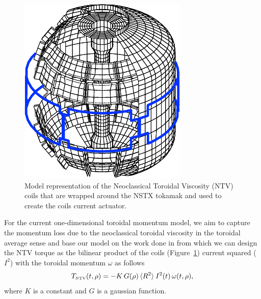 \documentclass[12pt]{iopart}
\begin{document}
\begin{figure}
	\centering
   \includegraphics[width=0.6\linewidth]{imene_figs/pic_NTV}
\caption{Model representation of the Neoclassical Toroidal Viscosity (NTV) coils that are wrapped around the NSTX tokamak and used to create the coils current actuator. }
  \label{pic_NTV}
\end{figure}
For the current one-dimensional toroidal momentum model, we aim to capture the momentum loss due to the neoclassical toroidal viscosity in the toroidal average sense and base our model on the work done in \cite{Zhu06} from which we can design the NTV torque as the bilinear product of the coils (Figure~\ref{pic_NTV}) current squared ($ I^2$) with the toroidal momentum $\omega$ as follows
\begin{equation}
   T_\textrm{\tiny NTV}  (t, \rho) =  - K \, G(\rho) \,  \langle R^2 \rangle \:  I^2(t) \,\omega (t, \rho),
    \label{eqn:ntv}
\end{equation}
where $K$ is a constant and $G$ is a gaussian function.
\end{document}
